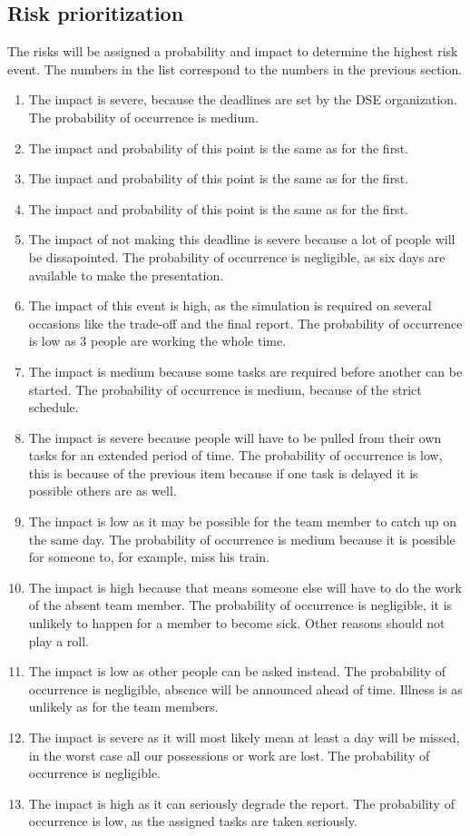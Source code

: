 \subsection{Risk prioritization}
The risks will be assigned a probability and impact to determine the highest risk event. The numbers in the list correspond to the numbers in the previous section.
\begin{enumerate}
	\item The impact is severe, because the deadlines are set by the DSE organization. The probability of occurrence is medium.
	\item The impact and probability of this point is the same as for the first.
	\item The impact and probability of this point is the same as for the first.
	\item The impact and probability of this point is the same as for the first.
	\item The impact of not making this deadline is severe because a lot of people will be dissapointed. The probability of occurrence is negligible, as six days are available to make the presentation.
	\item The impact of this event is high, as the simulation is required on several occasions like the trade-off and the final report. The probability of occurrence is low as 3 people are working the whole time.
	\item The impact is medium because some tasks are required before another can be started. The probability of occurrence is medium, because of the strict schedule.
	\item The impact is severe because people will have to be pulled from their own tasks for an extended period of time. The probability of occurrence is low, this is because of the previous item because if one task is delayed it is possible others are as well.
	\item The impact is low as it may be possible for the team member to catch up on the same day. The probability of occurrence is medium because it is possible for someone to, for example, miss his train.
	\item The impact is high because that means someone else will have to do the work of the absent team member. The probability of occurrence is negligible, it is unlikely to happen for a member to become sick. Other reasons should not play a roll.
	\item The impact is low as other people can be asked instead. The probability of occurrence is negligible, absence will be announced ahead of time. Illness is as unlikely as for the team members.
	\item The impact is severe as it will most likely mean at least a day will be missed, in the worst case all our possessions or work are lost. The probability of occurrence is negligible.
	\item The impact is high as it can seriously degrade the report. The probability of occurrence is low, as the assigned tasks are taken seriously.
\end{enumerate}

